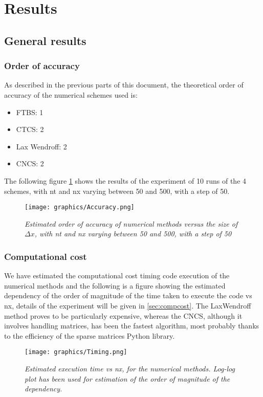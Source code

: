

\section{Results}

\subsection{General results}

\subsubsection{Order of accuracy}
As described in the previous parts of this document, the theoretical order of accuracy of the numerical schemes used is:
\begin{itemize}
	\item FTBS: 1
	\item CTCS: 2
	\item Lax Wendroff: 2
	\item CNCS: 2
\end{itemize}
The following figure \ref{fig:orderofacc} shows the results of the experiment of 10 runs of the 4 schemes, with nt and nx varying between 50 and 500, with a step of 50.
\begin{figure}[H]
	\begin{center}
		\texttt{[image: graphics/Accuracy.png]}
	\end{center}%
	\caption[Order of accuracy of numerical methods]{ \em Estimated order of accuracy of numerical methods versus the size of $\Delta x$, with nt and nx varying between 50 and 500, with a step of 50}
	\label{fig:orderofacc}
\end{figure}

\subsubsection{Computational cost}
We have estimated the computational cost timing code execution of the numerical methods and the following is a figure showing the estimated dependency of the order of magnitude of the time taken to execute the code vs nx, details of the experiment will be given in \ref{sec:compcost}. The LaxWendroff method proves to be particularly expensive, whereas the CNCS, although it involves handling matrices, has been the fastest algorithm, most probably thanks to the efficiency of the sparse matrices Python library.
\begin{figure}[H]
	\begin{center}
		\texttt{[image: graphics/Timing.png]}
	\end{center}%
	\caption[computational cost of numerical methods]{ \em Estimated execution time vs nx, for the numerical methods. Log-log plot has been used for estimation of the order of magnitude of the dependency.}
	\label{fig:timing}
\end{figure}

